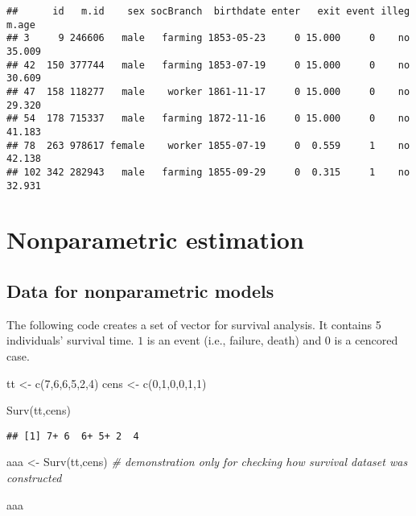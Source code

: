 \documentclass[
]{book}
\newenvironment{Shaded}{\begin{snugshade}}{\end{snugshade}}
\newcommand{\CommentTok}[1]{\textcolor[rgb]{0.56,0.35,0.01}{\textit{#1}}}
\newcommand{\DecValTok}[1]{\textcolor[rgb]{0.00,0.00,0.81}{#1}}
\newcommand{\FunctionTok}[1]{\textcolor[rgb]{0.00,0.00,0.00}{#1}}
\newcommand{\NormalTok}[1]{#1}
\newcommand{\OtherTok}[1]{\textcolor[rgb]{0.56,0.35,0.01}{#1}}
\begin{document}
\begin{verbatim}
##      id   m.id    sex socBranch  birthdate enter   exit event illeg  m.age
## 3     9 246606   male   farming 1853-05-23     0 15.000     0    no 35.009
## 42  150 377744   male   farming 1853-07-19     0 15.000     0    no 30.609
## 47  158 118277   male    worker 1861-11-17     0 15.000     0    no 29.320
## 54  178 715337   male   farming 1872-11-16     0 15.000     0    no 41.183
## 78  263 978617 female    worker 1855-07-19     0  0.559     1    no 42.138
## 102 342 282943   male   farming 1855-09-29     0  0.315     1    no 32.931
\end{verbatim}

\hypertarget{nonparametric-estimation}{%
\section{Nonparametric estimation}\label{nonparametric-estimation}}

\hypertarget{data-for-nonparametric-models}{%
\subsection{Data for nonparametric models}\label{data-for-nonparametric-models}}

The following code creates a set of vector for survival analysis. It contains 5 individuals' survival time. \(1\) is an event (i.e., failure, death) and \(0\) is a cencored case.

\begin{Shaded}
\begin{Highlighting}[]
\NormalTok{tt }\OtherTok{\textless{}{-}} \FunctionTok{c}\NormalTok{(}\DecValTok{7}\NormalTok{,}\DecValTok{6}\NormalTok{,}\DecValTok{6}\NormalTok{,}\DecValTok{5}\NormalTok{,}\DecValTok{2}\NormalTok{,}\DecValTok{4}\NormalTok{)}
\NormalTok{cens }\OtherTok{\textless{}{-}} \FunctionTok{c}\NormalTok{(}\DecValTok{0}\NormalTok{,}\DecValTok{1}\NormalTok{,}\DecValTok{0}\NormalTok{,}\DecValTok{0}\NormalTok{,}\DecValTok{1}\NormalTok{,}\DecValTok{1}\NormalTok{)}

\FunctionTok{Surv}\NormalTok{(tt,cens)}
\end{Highlighting}
\end{Shaded}

\begin{verbatim}
## [1] 7+ 6  6+ 5+ 2  4
\end{verbatim}

\begin{Shaded}
\begin{Highlighting}[]
\NormalTok{aaa }\OtherTok{\textless{}{-}} \FunctionTok{Surv}\NormalTok{(tt,cens) }\CommentTok{\# demonstration only for checking how survival dataset was constructed}

\NormalTok{aaa}
\end{Highlighting}
\end{Shaded}
\end{document}
